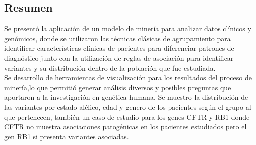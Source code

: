 \subsection*{Resumen}

Se presentó la aplicación de un modelo de minería para analizar datos clínicos y genómicos, donde se utilizaron las técnicas clásicas de  agrupamiento para identificar características clínicas de pacientes para diferenciar patrones de diagnóstico junto con la utilización de reglas de asociación para identificar variantes y su distribución dentro de la población que fue estudiada.\\

Se desarrollo de herramientas de visualización para los resultados del proceso de minería,lo que permitió generar análisis diversos y posibles preguntas que aportaron a la investigación en genética humana. Se muestro la distribución de las variantes por estado alélico, edad y genero de los pacientes según el grupo al que pertenecen, también un caso de estudio para los genes CFTR y RB1 donde CFTR no muestra asociaciones patogénicas en los pacientes estudiados pero el gen RB1 si presenta variantes asociadas.




   
